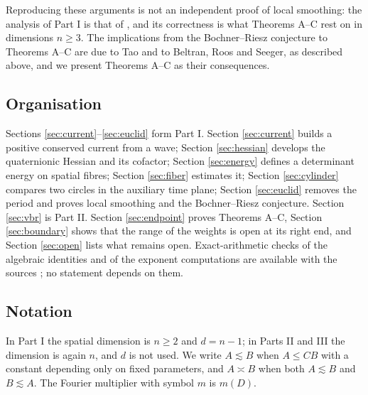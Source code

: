 Reproducing these arguments is not an independent proof of local smoothing: the analysis of
Part I is that of \cite{OAI26}, and its correctness is what Theorems A--C rest on in dimensions
$n\ge3$. The implications from the Bochner--Riesz conjecture to Theorems A--C are due to Tao and
to Beltran, Roos and Seeger, as described above, and we present Theorems A--C as their
consequences.

\subsection{Organisation}
Sections \ref{sec:current}--\ref{sec:euclid} form Part I. Section \ref{sec:current} builds a
positive conserved current from a wave; Section \ref{sec:hessian} develops the quaternionic
Hessian and its cofactor; Section \ref{sec:energy} defines a determinant energy on spatial
fibres; Section \ref{sec:fiber} estimates it; Section \ref{sec:cylinder} compares two circles in
the auxiliary time plane; Section \ref{sec:euclid} removes the period and proves local
smoothing and the Bochner--Riesz conjecture. Section \ref{sec:vbr} is Part II. Section
\ref{sec:endpoint} proves Theorems A--C, Section \ref{sec:boundary} shows that the range of the
weights is open at its right end, and Section \ref{sec:open} lists what remains open.
Exact-arithmetic checks of the algebraic identities and of the exponent computations are
available with the sources \cite{Bha26arch}; no statement depends on them.

\subsection{Notation}
In Part I the spatial dimension is $n\ge2$ and $d=n-1$; in Parts II and III the dimension is
again $n$, and $d$ is not used. We write $A\lesssim B$ when $A\le CB$ with a constant
depending only on fixed parameters, and $A\asymp B$ when both $A\lesssim B$ and $B\lesssim A$.
The Fourier multiplier with symbol $m$ is $m(D)$.
